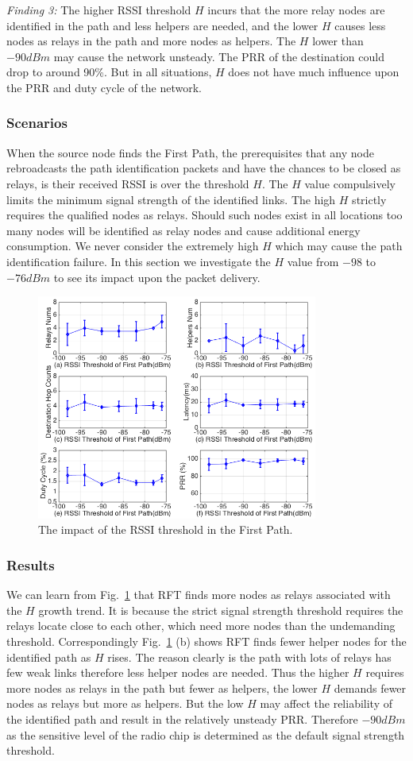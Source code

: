 \documentclass[conference]{IEEEtran}
\begin{document}
\emph{Finding 3:} 
The higher RSSI threshold $H$ incurs that the more relay nodes are identified in the path and less helpers are needed, and the lower $H$ causes less nodes as relays in the path and more nodes as helpers. The $H$ lower than $-90dBm$ may cause the network unsteady. The PRR of the destination could drop to around 90\%. But in all situations, $H$ does not have much influence upon the PRR and duty cycle of the network.
\subsubsection{Scenarios}
When the source node finds the First Path, the prerequisites that any node rebroadcasts the path identification packets and have the chances to be closed as relays, is their received RSSI is over the threshold $H$. The $H$ value compulsively limits the minimum signal strength of the identified links. The high $H$ strictly requires the qualified nodes as relays. Should such nodes exist in all locations too many nodes will be identified as relay nodes and cause additional energy consumption. We never consider the extremely high $H$ which may cause the path identification failure. In this section we investigate the $H$ value from $-98$ to $-76 dBm$ to see its impact upon the packet delivery.
\begin{figure}
\centering
\includegraphics[height=7.4cm]{errorbar_thrssi_ANS3.png}
\caption{The impact of the RSSI threshold in the First Path.}
\label{fig:testthrssi}
\end{figure}
\subsubsection{Results}
We can learn from Fig.~\ref{fig:testthrssi} that RFT finds more nodes as relays associated with the $H$ growth trend. It is because the strict signal strength threshold requires the relays locate close to each other, which need more nodes than the undemanding threshold. Correspondingly Fig.~\ref{fig:testthrssi} (b) shows RFT finds fewer helper nodes for the identified path as $H$ rises. The reason clearly is the path with lots of relays has few weak links therefore less helper nodes are needed. Thus the higher $H$ requires more nodes as relays in the path but fewer as helpers, the lower $H$ demands fewer nodes as relays but more as helpers. But the low $H$ may affect the reliability of the identified path and result in the relatively unsteady PRR. Therefore $-90 dBm$ as the sensitive level of the radio chip is determined as the default signal strength threshold.
\end{document}
